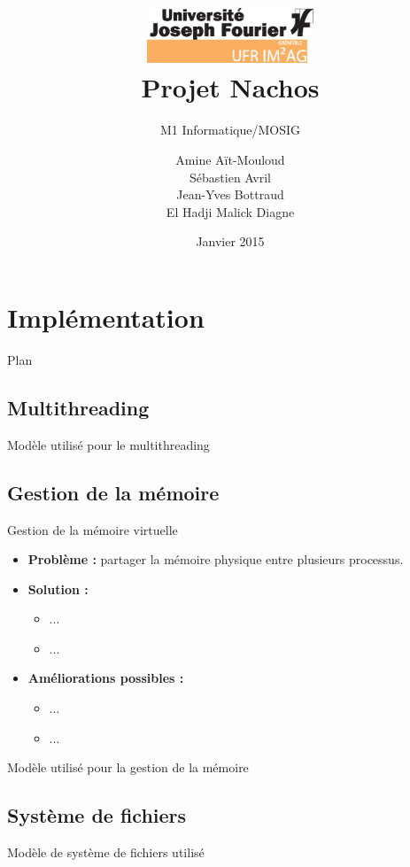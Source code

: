 \documentclass{beamer}
\title{\includegraphics[width=5cm]{LOGO_IM2AG_UJF.eps}
\\ Projet Nachos}
\subtitle{M1 Informatique/MOSIG}
\author{Amine Aït-Mouloud
\\ Sébastien Avril
\\ Jean-Yves Bottraud
\\ El Hadji Malick Diagne
}
\date{Janvier 2015}
\begin{document}
\frame{\titlepage} 

\begin{frame}
    \tableofcontents
\end{frame}

\section{Implémentation}
\begin{frame}{Plan}
    \tableofcontents[currentsection]
\end{frame}

\subsection{Multithreading}
\begin{frame}{Modèle utilisé pour le multithreading}
   
\end{frame}


\subsection{Gestion de la mémoire}
\begin{frame}{Gestion de la mémoire virtuelle}
    \begin{itemize}
        \item \textbf{Problème :} partager la mémoire physique entre plusieurs processus.
        \item \textbf{Solution :}
            \begin{itemize}
                \item ...
                \item ...
            \end{itemize}
        \item \textbf{Améliorations possibles :}
            \begin{itemize}
                \item ...
                \item ...
            \end{itemize}
    \end{itemize}
\end{frame}

\begin{frame}{Modèle utilisé pour la gestion de la mémoire}
    
\end{frame}

\subsection{Système de fichiers}
\begin{frame}{Modèle de système de fichiers utilisé}
    
\end{frame}
\end{document}
